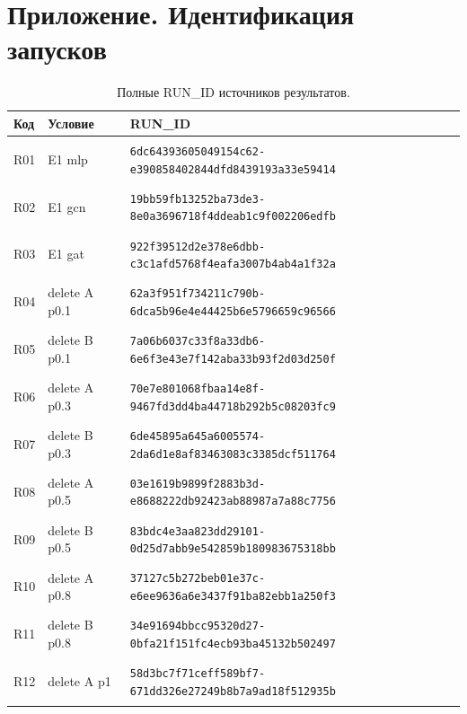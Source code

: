 \section*{Приложение. Идентификация запусков}
\begingroup\small{}
\begin{longtable}{@{}l>{\raggedright\arraybackslash}p{3.5cm}p{10.8cm}@{}}
\caption{Полные RUN\_ID источников результатов.}\\
\toprule Код & Условие & RUN\_ID \\ \midrule \endhead
\hypertarget{R01}{R01} & E1 mlp & {\fontsize{8.8}{11}\selectfont\texttt{6dc64393605049154c62-e390858402844dfd8439193a33e59414}} \\
\hypertarget{R02}{R02} & E1 gcn & {\fontsize{8.8}{11}\selectfont\texttt{19bb59fb13252ba73de3-8e0a3696718f4ddeab1c9f002206edfb}} \\
\hypertarget{R03}{R03} & E1 gat & {\fontsize{8.8}{11}\selectfont\texttt{922f39512d2e378e6dbb-c3c1afd5768f4eafa3007b4ab4a1f32a}} \\
\hypertarget{R04}{R04} & delete A p0.1 & {\fontsize{8.8}{11}\selectfont\texttt{62a3f951f734211c790b-6dca5b96e4e44425b6e5796659c96566}} \\
\hypertarget{R05}{R05} & delete B p0.1 & {\fontsize{8.8}{11}\selectfont\texttt{7a06b6037c33f8a33db6-6e6f3e43e7f142aba33b93f2d03d250f}} \\
\hypertarget{R06}{R06} & delete A p0.3 & {\fontsize{8.8}{11}\selectfont\texttt{70e7e801068fbaa14e8f-9467fd3dd4ba44718b292b5c08203fc9}} \\
\hypertarget{R07}{R07} & delete B p0.3 & {\fontsize{8.8}{11}\selectfont\texttt{6de45895a645a6005574-2da6d1e8af83463083c3385dcf511764}} \\
\hypertarget{R08}{R08} & delete A p0.5 & {\fontsize{8.8}{11}\selectfont\texttt{03e1619b9899f2883b3d-e8688222db92423ab88987a7a88c7756}} \\
\hypertarget{R09}{R09} & delete B p0.5 & {\fontsize{8.8}{11}\selectfont\texttt{83bdc4e3aa823dd29101-0d25d7abb9e542859b180983675318bb}} \\
\hypertarget{R10}{R10} & delete A p0.8 & {\fontsize{8.8}{11}\selectfont\texttt{37127c5b272beb01e37c-e6ee9636a6e3437f91ba82ebb1a250f3}} \\
\hypertarget{R11}{R11} & delete B p0.8 & {\fontsize{8.8}{11}\selectfont\texttt{34e91694bbcc95320d27-0bfa21f151fc4ecb93ba45132b502497}} \\
\hypertarget{R12}{R12} & delete A p1 & {\fontsize{8.8}{11}\selectfont\texttt{58d3bc7f71ceff589bf7-671dd326e27249b8b7a9ad18f512935b}} \\

\end{longtable}
